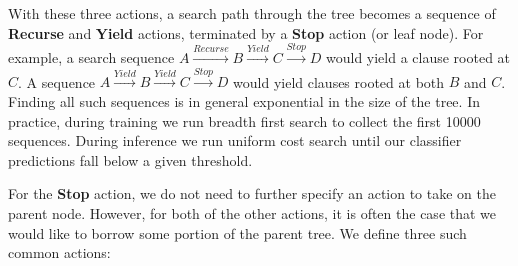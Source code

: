 
With these three actions, a search path through the tree becomes a sequence
  of \textbf{Recurse} and \textbf{Yield} actions, terminated by a \textbf{Stop}
  action (or leaf node).
For example, a search sequence 
  $A \xrightarrow{Recurse} B \xrightarrow{Yield} C \xrightarrow{Stop} D$
  would yield a clause rooted at $C$.
A sequence 
  $A \xrightarrow{Yield} B \xrightarrow{Yield} C \xrightarrow{Stop} D$
  would yield clauses rooted at both $B$ and $C$.
Finding all such sequences is in general exponential in the size of the tree.
In practice, during training we run breadth first search to collect the
  first \num{10000} sequences.
During inference we run uniform cost search until our classifier predictions
  fall below a given threshold.

For the \textbf{Stop} action, we do not need to further specify an action
  to take on the parent node.
However, for both of the other actions, it is often the case that we would like
  to borrow some portion of the parent tree. 
We define three such common actions:


